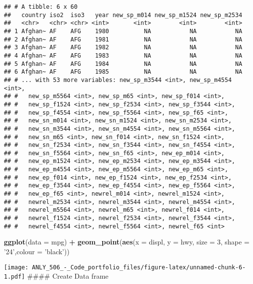 \documentclass[]{article}
\newenvironment{Shaded}{\begin{snugshade}}{\end{snugshade}}
\newcommand{\KeywordTok}[1]{\textcolor[rgb]{0.13,0.29,0.53}{\textbf{#1}}}
\newcommand{\DataTypeTok}[1]{\textcolor[rgb]{0.13,0.29,0.53}{#1}}
\newcommand{\DecValTok}[1]{\textcolor[rgb]{0.00,0.00,0.81}{#1}}
\newcommand{\StringTok}[1]{\textcolor[rgb]{0.31,0.60,0.02}{#1}}
\newcommand{\OperatorTok}[1]{\textcolor[rgb]{0.81,0.36,0.00}{\textbf{#1}}}
\newcommand{\NormalTok}[1]{#1}
\begin{document}
\begin{verbatim}
## # A tibble: 6 x 60
##   country iso2  iso3   year new_sp_m014 new_sp_m1524 new_sp_m2534
##   <chr>   <chr> <chr> <int>       <int>        <int>        <int>
## 1 Afghan~ AF    AFG    1980          NA           NA           NA
## 2 Afghan~ AF    AFG    1981          NA           NA           NA
## 3 Afghan~ AF    AFG    1982          NA           NA           NA
## 4 Afghan~ AF    AFG    1983          NA           NA           NA
## 5 Afghan~ AF    AFG    1984          NA           NA           NA
## 6 Afghan~ AF    AFG    1985          NA           NA           NA
## # ... with 53 more variables: new_sp_m3544 <int>, new_sp_m4554 <int>,
## #   new_sp_m5564 <int>, new_sp_m65 <int>, new_sp_f014 <int>,
## #   new_sp_f1524 <int>, new_sp_f2534 <int>, new_sp_f3544 <int>,
## #   new_sp_f4554 <int>, new_sp_f5564 <int>, new_sp_f65 <int>,
## #   new_sn_m014 <int>, new_sn_m1524 <int>, new_sn_m2534 <int>,
## #   new_sn_m3544 <int>, new_sn_m4554 <int>, new_sn_m5564 <int>,
## #   new_sn_m65 <int>, new_sn_f014 <int>, new_sn_f1524 <int>,
## #   new_sn_f2534 <int>, new_sn_f3544 <int>, new_sn_f4554 <int>,
## #   new_sn_f5564 <int>, new_sn_f65 <int>, new_ep_m014 <int>,
## #   new_ep_m1524 <int>, new_ep_m2534 <int>, new_ep_m3544 <int>,
## #   new_ep_m4554 <int>, new_ep_m5564 <int>, new_ep_m65 <int>,
## #   new_ep_f014 <int>, new_ep_f1524 <int>, new_ep_f2534 <int>,
## #   new_ep_f3544 <int>, new_ep_f4554 <int>, new_ep_f5564 <int>,
## #   new_ep_f65 <int>, newrel_m014 <int>, newrel_m1524 <int>,
## #   newrel_m2534 <int>, newrel_m3544 <int>, newrel_m4554 <int>,
## #   newrel_m5564 <int>, newrel_m65 <int>, newrel_f014 <int>,
## #   newrel_f1524 <int>, newrel_f2534 <int>, newrel_f3544 <int>,
## #   newrel_f4554 <int>, newrel_f5564 <int>, newrel_f65 <int>
\end{verbatim}

\begin{Shaded}
\begin{Highlighting}[]
\KeywordTok{ggplot}\NormalTok{(}\DataTypeTok{data =}\NormalTok{ mpg) }\OperatorTok{+}\StringTok{ }
\StringTok{  }\KeywordTok{geom_point}\NormalTok{(}\KeywordTok{aes}\NormalTok{(}\DataTypeTok{x =}\NormalTok{ displ, }\DataTypeTok{y =}\NormalTok{ hwy, }\DataTypeTok{size =} \DecValTok{3}\NormalTok{, }\DataTypeTok{shape =} \StringTok{'24'}\NormalTok{,}\DataTypeTok{colour =} \StringTok{'black'}\NormalTok{))}
\end{Highlighting}
\end{Shaded}

\texttt{[image: ANLY\_506\_-\_Code\_portfolio\_files/figure-latex/unnamed-chunk-6-1.pdf]}
\#\#\#\# Create Data frame
\end{document}
